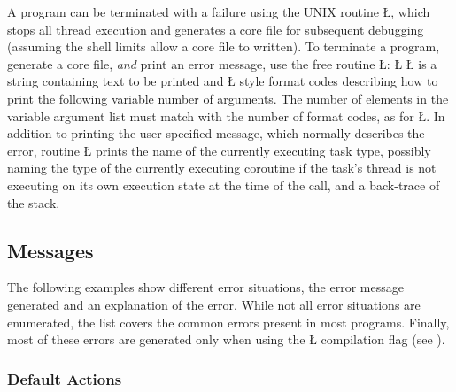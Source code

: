 \documentclass[openright,twoside]{report}
\begin{document}
A \uC program can be terminated with a failure using the UNIX routine \LGinlinetrue\LGbegin\lgrinde\L{}\endlgrinde\LGend{}, which stops all thread execution and generates a core file for subsequent debugging (assuming the shell limits allow a core file to written).
To terminate a program, generate a core file, \emph{and} print an error message, use the \uC free routine \LGinlinetrue\LGbegin\lgrinde\L{}\endlgrinde\LGend{}:
\LGinlinefalse\LGbegin\lgrinde
\L{}
\endlgrinde\LGend
\LGinlinetrue\LGbegin\lgrinde\L{}\endlgrinde\LGend{} is a string containing text to be printed and \LGinlinetrue\LGbegin\lgrinde\L{}\endlgrinde\LGend{} style format codes describing how to print the following variable number of arguments.
The number of elements in the variable argument list must match with the number of format codes, as for \LGinlinetrue\LGbegin\lgrinde\L{}\endlgrinde\LGend{}.
In addition to printing the user specified message, which normally describes the error, routine \LGinlinetrue\LGbegin\lgrinde\L{}\endlgrinde\LGend{} prints the name of the currently executing task type, possibly naming the type of the currently executing coroutine if the task's thread is not executing on its own execution state at the time of the call, and a back-trace of the stack.


\subsection{Messages}

The following examples show different error situations, the error message generated and an explanation of the error.
While not all error situations are enumerated, the list covers the common errors present in most \uC programs.
Finally, most of these errors are generated only when using the \LGinlinetrue\LGbegin\lgrinde\L{}\endlgrinde\LGend{} compilation flag (see ).


\subsubsection{Default Actions}
\label{s:DefaultActions}
\end{document}
